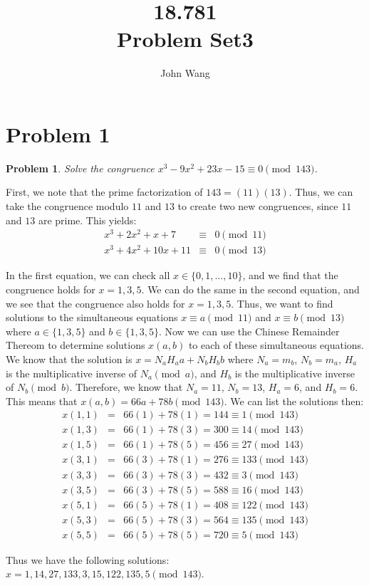 \documentclass[psamsfonts]{amsart}
\title{18.781 \\
Problem Set3}
\author{John Wang}
\newtheorem{prob}{Problem}[section]
\newenvironment{sol}{{\bfseries Solution}}{\qedsymbol}
\theoremstyle{definition}
\theoremstyle{remark}
\numberwithin{equation}{section}
\begin{document}
\maketitle

\section{Problem 1}

\begin{prob}
Solve the congruence $x^3 - 9x^2 + 23x - 15 \equiv 0 \pmod{143}$. 
\end{prob}

\begin{sol}
First, we note that the prime factorization of $143 = (11)(13)$. Thus, we can take the congruence modulo $11$ and $13$ to create two new congruences, since $11$ and $13$ are prime. This yields:
\begin{eqnarray}
x^3 + 2x^2 + x + 7 &\equiv& 0 \pmod{11} \\
x^3 + 4x^2 + 10x + 11 &\equiv& 0 \pmod{13} 
\end{eqnarray} 

In the first equation, we can check all $x \in \{0, 1, \ldots, 10 \}$, and we find that the congruence holds for $x=1,3,5$. We can do the same in the second equation, and we see that the congruence also holds for $x = 1,3,5$. Thus, we want to find solutions to the simultaneous equations $x \equiv a \pmod{11}$ and $x \equiv b \pmod{13}$ where $a \in \{1,3,5\}$ and $b \in \{1,3,5\}$. Now we can use the Chinese Remainder Thereom to determine solutions $x(a,b)$ to each of these simultaneous equations. We know that the solution is $x = N_a H_a a + N_b H_b b$ where $N_a = m_b$, $N_b = m_a$, $H_a$ is the multiplicative inverse of $N_a \pmod {a}$, and $H_b$ is the multiplicative inverse of $N_b \pmod{b}$. Therefore, we know that $N_a = 11$, $N_b = 13$, $H_a = 6$, and $H_b = 6$. This means that $x(a,b) = 66a + 78b \pmod{143}$. We can list the solutions then:
\begin{eqnarray}
x(1,1) &=& 66(1) + 78(1) = 144 \equiv 1 \pmod{143} \\
x(1,3) &=& 66(1) + 78(3) = 300 \equiv 14 \pmod{143} \\
x(1,5) &=& 66(1) + 78(5) = 456 \equiv 27 \pmod{143} \\
x(3,1) &=& 66(3) + 78(1) = 276 \equiv 133 \pmod{143} \\
x(3,3) &=& 66(3) + 78(3) = 432 \equiv 3 \pmod{143} \\ 
x(3,5) &=& 66(3) + 78(5) = 588 \equiv 16 \pmod{143} \\
x(5,1) &=& 66(5) + 78(1) = 408 \equiv 122 \pmod{143} \\
x(5,3) &=& 66(5) + 78(3) = 564 \equiv 135 \pmod{143} \\
x(5,5) &=& 66(5) + 78(5) = 720 \equiv 5 \pmod{143}
\end{eqnarray}

Thus we have the following solutions: $x = 1,14,27,133,3,15,122,135,5 \pmod{143}$. 
\end{sol}
\end{document}
